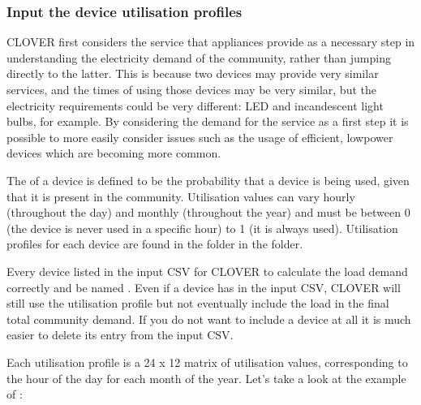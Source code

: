 \documentclass[letterpaper,10pt,english]{sphinxmanual}
\begin{document}
\sphinxAtStartPar
{}  


\subsubsection{Input the device utilisation profiles}
\label{\detokenize{load:input-the-device-utilisation-profiles}}
\sphinxAtStartPar
CLOVER first considers the service that appliances provide as a
necessary step in understanding the electricity demand of the community,
rather than jumping directly to the latter. This is because two devices
may provide very similar services, and the times of using those devices
may be very similar, but the electricity requirements could be very
different: LED and incandescent light bulbs, for example. By considering
the demand for the service as a first step it is possible to more easily
consider issues such as the usage of efficient, low\sphinxhyphen{}power devices which
are becoming more common.

\sphinxAtStartPar
The  of a device is defined to be the probability that a
device is being used, given that it is present in the community.
Utilisation values can vary hourly (throughout the day) and monthly
(throughout the year) and must be between 0 (the device is never used in
a specific hour) to 1 (it is always used). Utilisation profiles for each
device are found in the  folder in the 
folder.

\sphinxAtStartPar
Every device listed in the  input CSV  for CLOVER to calculate the
load demand correctly and be named . Even if a device
has  in the  input CSV, CLOVER will still use
the utilisation profile but not eventually include the load in the final
total community demand. If you do not want to include a device at all it
is much easier to delete its entry from the  input CSV.

\sphinxAtStartPar
Each utilisation profile is a 24 x 12 matrix of utilisation values,
corresponding to the hour of the day for each month of the year. Let’s
take a look at the example of :
\end{document}
